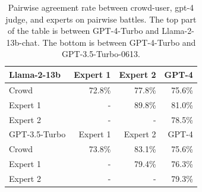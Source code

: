 \documentclass{article}
\begin{document}
\begin{table}[t!]
\centering
\caption{Pairwise agreement rate between crowd-user, gpt-4 judge, and experts on pairwise battles. The top part of the table is between GPT-4-Turbo and Llama-2-13b-chat. The bottom is between GPT-4-Turbo and GPT-3.5-Turbo-0613.}
\label{table:agreement-rate}
\footnotesize
\begin{tabular}{lrrr}
\toprule
Llama-2-13b & Expert 1 & Expert 2  & GPT-4 \\
\midrule
Crowd      & 72.8\% & 77.8\% & 75.6\% \\
Expert 1        &   -   & 89.8\% & 81.0\% \\
Expert 2        &   -   &   -       & 78.5\% \\
\midrule
GPT-3.5-Turbo & Expert 1 & Expert 2  & GPT-4 \\
\midrule
Crowd      & 73.8\%& 83.1\% & 75.6\%\\
Expert 1        &   -   & 79.4\% & 76.3\%\\
Expert 2        &   -   &   -    & 79.3\%\\
\bottomrule
\end{tabular}
\vspace{-15px}
\end{table}


\begin{table}[t!]
\centering
\caption{GPT-4-Turbo's win-rate across crowd-user, gpt-4 judge, and experts on pairwise battles against Llama-2-13b and GPT-3.5-Turbo-0613.}
\label{table:gpt-4-turbo-win-rate}
{}
\vspace{-0.5em}
\end{table}


\end{document}
